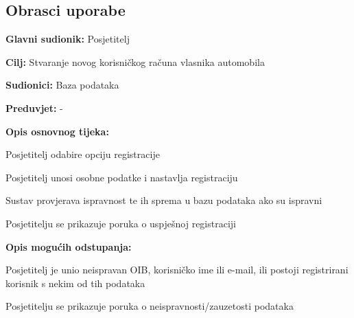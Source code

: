 			\eject 
			
			
				
			\subsection{Obrasci uporabe}
				
%				
					


\noindent {}
\begin{packed_item}

	\item \textbf{Glavni sudionik: } Posjetitelj
	\item  \textbf{Cilj:} Stvaranje novog korisničkog računa vlasnika
	automobila
	\item  \textbf{Sudionici:} Baza podataka
	\item  \textbf{Preduvjet:} -
	\item  \textbf{Opis osnovnog tijeka:}

	\item[] \begin{packed_enum}

		\item Posjetitelj odabire opciju registracije
		\item Posjetitelj unosi osobne podatke i nastavlja registraciju
		\item Sustav provjerava ispravnost te ih sprema u bazu podataka ako su ispravni
		\item Posjetitelju se prikazuje poruka o uspješnoj registraciji
	\end{packed_enum}

	\item  \textbf{Opis mogućih odstupanja:}

	\item[] \begin{packed_item}

		\item[3.a] Posjetitelj je unio neispravan OIB, korisničko ime ili e-mail,
		ili postoji registrirani korisnik s nekim od tih podataka
		\item[] \begin{packed_enum}

			\item Posjetitelju se prikazuje poruka o neispravnosti/zauzetosti
			podataka

		\end{packed_enum}

	\end{packed_item}
\end{packed_item}

